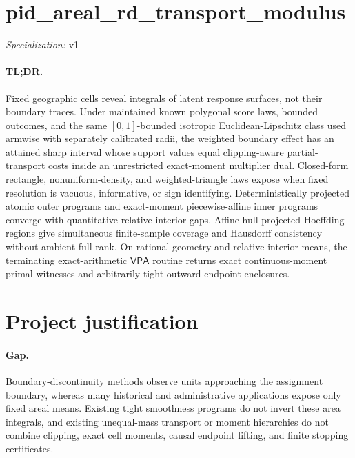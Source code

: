 \documentclass{article}
\begin{document}
\sloppy

\section*{pid\_\allowbreak{}areal\_\allowbreak{}rd\_\allowbreak{}transport\_\allowbreak{}modulus}

\noindent\textit{Specialization:} v1\par

\paragraph{TL;DR.} Fixed geographic cells reveal integrals of latent response surfaces, not their boundary traces. Under maintained known polygonal score laws, bounded outcomes, and the same \([0,1]\)-bounded isotropic Euclidean-Lipschitz class used armwise with separately calibrated radii, the weighted boundary effect has an attained sharp interval whose support values equal clipping-aware partial-transport costs inside an unrestricted exact-moment multiplier dual. Closed-form rectangle, nonuniform-density, and weighted-triangle laws expose when fixed resolution is vacuous, informative, or sign identifying. Deterministically projected atomic outer programs and exact-moment piecewise-affine inner programs converge with quantitative relative-interior gaps. Affine-hull-projected Hoeffding regions give simultaneous finite-sample coverage and Hausdorff consistency without ambient full rank. On rational geometry and relative-interior means, the terminating exact-arithmetic \(\mathsf{VPA}\) routine returns exact continuous-moment primal witnesses and arbitrarily tight outward endpoint enclosures.

\section{Project justification}

\paragraph{Gap.} Boundary-discontinuity methods observe units approaching the assignment boundary, whereas many historical and administrative applications expose only fixed areal means. Existing tight smoothness programs do not invert these area integrals, and existing unequal-mass transport or moment hierarchies do not combine clipping, exact cell moments, causal endpoint lifting, and finite stopping certificates.
\end{document}
